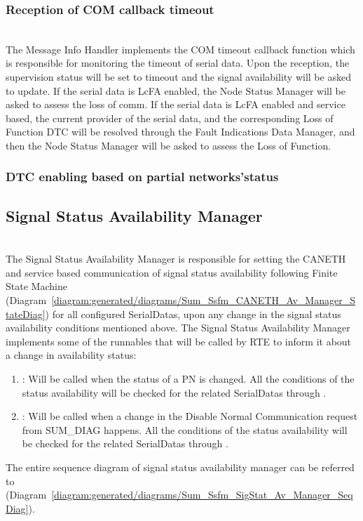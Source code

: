 \subsubsection{Reception of COM callback timeout}
\\
The Message Info Handler implements the COM timeout callback function which is responsible for monitoring the timeout of serial data.
Upon the reception, the supervision status will be set to timeout and the signal availability will be asked to update. 
If the serial data is LcFA enabled, the Node Status Manager will be asked to assess the loss of comm.
If the serial data is LcFA enabled and service based, the current provider of the serial data, and the corresponding Loss of Function DTC
will be resolved through the Fault Indications Data Manager, and then the Node Status Manager will be asked to assess the Loss of Function. 

{ }

\subsubsection{DTC enabling based on partial networks'status}

\subsection{Signal Status Availability Manager}
\\
The Signal Status Availability Manager is responsible for setting the CANETH and service based communication of signal status availability following Finite State Machine (Diagram~\ref{diagram:generated/diagrams/Sum_Ssfm_CANETH_Av_Manager_StateDiag}) for all configured SerialDatas, upon any change in the signal status availability conditions mentioned above.
The Signal Status Availability Manager implements some of the runnables that will be called by RTE to inform it about a change in availability status:
\begin{enumerate}
    \item {}: Will be called when the status of a PN is changed. All the conditions of the status availability will be checked for the related SerialDatas through .
    \item {}: Will be called when a change in the Disable Normal Communication request from SUM_DIAG happens. All the conditions of the status availability will be checked for the related SerialDatas through .
\end{enumerate}  
The entire sequence diagram of signal status availability manager can be referred to (Diagram~\ref{diagram:generated/diagrams/Sum_Ssfm_SigStat_Av_Manager_SeqDiag}).

